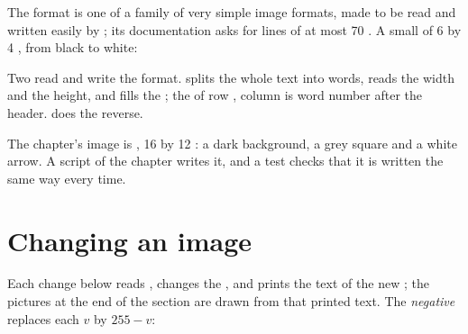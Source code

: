 The format is one of a family of very simple image formats, made to be read and
written easily by ; its documentation asks for lines of at most 70
. A small  of 6 by 4 , from black to white:

\label{lst:g9:grids-and-images:make}

\label{out:g9:grids-and-images:make}

Two  read and write the format.  splits the whole text
into words, reads the width and the height, and fills the ; the  of
row , column  is word number  after the
header.  does the reverse.

\label{lst:g9:grids-and-images:pgm}

The chapter's image is , 16 by 12 : a dark background, a
grey square and a white arrow. A script of the chapter writes it, and a test
checks that it is written the same way every time.

\label{lst:g9:grids-and-images:read}

\label{out:g9:grids-and-images:read}

\section{Changing an image}

Each change below reads , changes the , and prints the text of
the new ; the pictures at the end of the section are drawn from that
printed text. The \emph{negative} replaces each  $v$ by $255 - v$:

